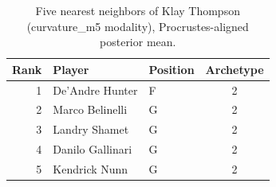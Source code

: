 \begin{table}[htbp]
  \centering\small
  \begin{tabular}{rllc}
    \toprule
    Rank & Player & Position & Archetype \\
    \midrule
    1 & De'Andre Hunter & F & 2 \\
    2 & Marco Belinelli & G & 2 \\
    3 & Landry Shamet & G & 2 \\
    4 & Danilo Gallinari & G & 2 \\
    5 & Kendrick Nunn & G & 2 \\
    \bottomrule
  \end{tabular}
  \caption{Five nearest neighbors of Klay Thompson (curvature_m5 modality), Procrustes-aligned posterior mean.}
  \label{tab:Klay_Thompson_neighbors_curvature_m5}
\end{table}

